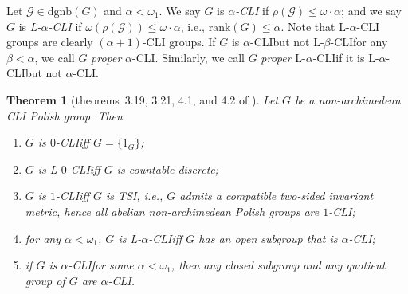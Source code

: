 \documentclass[11pt]{amsart}
\newtheorem{theorem}{Theorem}[section]
\theoremstyle{definition}
\theoremstyle{remark}
\numberwithin{equation}{section}
\def\rank{{\mathrm{rank}}}
\def\dgnb{{\mathrm{dgnb}}}
\def\hier#1{$#1$-CLI}
\def\otr#1#2{T_{\mathcal{#1}}^{#2}}
\begin{document}
Let $\mathcal{G}\in\dgnb(G)$ and $\alpha<\omega_1$. We say $G$ is \textit{\hier\alpha} if $\rho(\mathcal{G})\leq\omega\cdot\alpha$; and we say $G$ is \textit{L-\hier\alpha} if $\omega(\rho(\mathcal G))\leq\omega\cdot\alpha$, i.e., $\rank(G)\leq\alpha$. Note that L-$\alpha$-CLI groups are clearly $(\alpha+1)$-CLI groups. If $G$ is \hier\alpha\space but not L-\hier\beta\space for any $\beta<\alpha$, we call $G$ {\it proper} \hier\alpha. Similarly, we call $G$ {\it proper} L-\hier\alpha\space if it is L-\hier\alpha\space but not \hier\alpha.

\begin{theorem}[theorems~3.19, 3.21, 4.1, and 4.2 of \cite{DingW}]
    Let $G$ be a non-archimedean CLI Polish group. Then
    \begin{enumerate}
        \item $G$ is \hier0\space iff $G=\{1_G\}$;
        \item $G$ is L-\hier0\space iff $G$ is countable discrete;
        \item $G$ is \hier1\space iff $G$ is TSI, i.e., $G$ admits a compatible two-sided invariant metric, hence all abelian non-archimedean Polish groups are \hier1;
        \item for any $\alpha<\omega_1$, $G$ is L-\hier\alpha\space iff $G$ has an open subgroup that is \hier\alpha;
        \item if $G$ is \hier\alpha\space for some $\alpha<\omega_1$, then any closed subgroup and any quotient group of $G$ are \hier\alpha.
    \end{enumerate}
\end{theorem}
\end{document}
